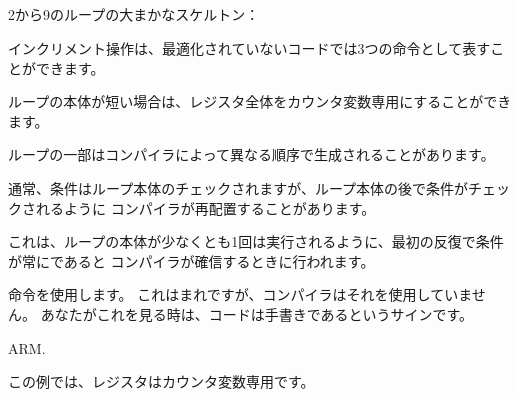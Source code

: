 ﻿%
\subsection{\Conclusion{}}

2から9のループの大まかなスケルトン：



インクリメント操作は、最適化されていないコードでは3つの命令として表すことができます。



ループの本体が短い場合は、レジスタ全体をカウンタ変数専用にすることができます。



ループの一部はコンパイラによって異なる順序で生成されることがあります。



通常、条件はループ本体のチェックされますが、ループ本体の後で条件がチェックされるように
コンパイラが再配置することがあります。

これは、ループの本体が少なくとも1回は実行されるように、最初の反復で条件が常にであると
コンパイラが確信するときに行われます。




命令を使用します。 これはまれですが、コンパイラはそれを使用していません。
あなたがこれを見る時は、コードは手書きであるというサインです。



ARM. 

この例では、レジスタはカウンタ変数専用です。




